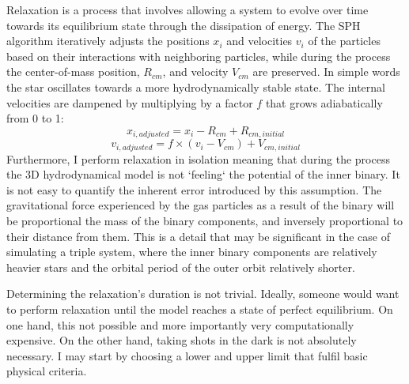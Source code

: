 Relaxation is a process that involves allowing a system to evolve over time towards its equilibrium state through the dissipation of energy. The SPH algorithm iteratively adjusts the positions $x_i$ and velocities $v_i$ of the particles based on their interactions with neighboring particles, while during the process the center-of-mass position, $R_{cm}$, and velocity $V_{cm}$ are preserved. In simple words the star oscillates towards a more hydrodynamically stable state. The internal velocities are dampened by multiplying by a factor $f$ that grows adiabatically from 0 to 1:
\begin{equation}\label{eq:adjust_positions}
    x_{i,adjusted} = x_i - R_{cm} + R_{cm,initial}
\end{equation}
\begin{equation}\label{eq:adjust_velocities}
    v_{i,adjusted} = f \times (v_i - V_{cm}) + V_{cm,initial}
\end{equation} 
Furthermore, I perform relaxation in isolation meaning that during the process the 3D hydrodynamical model is not `feeling` the potential of the inner binary. It is not easy to quantify the inherent error introduced by this assumption. The gravitational force experienced by the gas particles as a result of the binary will be proportional the mass of the binary components, and inversely proportional to their distance from them. This is a detail that may be significant in the case of simulating a triple system, where the inner binary components are relatively heavier stars and the orbital period of the outer orbit relatively shorter.

Determining the relaxation's duration is not trivial. Ideally, someone would want to perform relaxation until the model reaches a state of perfect equilibrium. On one hand, this not possible and more importantly very computationally expensive. On the other hand, taking shots in the dark is not absolutely necessary. I may start by choosing a lower and upper limit that fulfil basic physical criteria.

